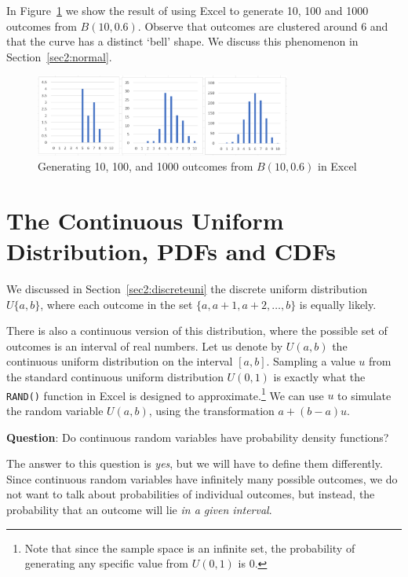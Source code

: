In Figure~\ref{fig:2_histogram_binomial} we show the result of using Excel to generate 10, 100 and 1000 outcomes from $B(10,0.6)$.
Observe that outcomes are clustered around $6$ and that the curve has a distinct `bell' shape.
We discuss this phenomenon in Section~\ref{sec2:normal}.


\begin{figure}[htbp]
	\centering
	\includegraphics[width=0.75\textwidth]{fig/2_histogram_binomial.png}
	\caption{Generating 10, 100, and 1000 outcomes from $B(10,0.6)$ in Excel \label{fig:2_histogram_binomial}}
\end{figure}




\section{The Continuous Uniform Distribution, PDFs and CDFs}

We discussed in Section~\ref{sec2:discreteuni} the discrete uniform distribution $U\{a,b\}$, where each outcome in the set $\{a,a+1,a+2,\ldots,b\}$ is equally likely.

There is also a continuous version of this distribution, where the possible set of outcomes is an interval of real numbers.
Let us denote by $U(a,b)$ the continuous uniform distribution on the interval $[a,b]$.
Sampling a value $u$ from the standard continuous uniform distribution $U(0,1)$ is exactly what the \texttt{RAND()} function in Excel is designed to approximate.\footnote{Note that since the sample space is an infinite set, the probability of generating any specific value from $U(0,1)$ is 0.}
We can use $u$ to simulate the random variable $U(a,b)$, using the transformation $a + (b-a)u.$

\textbf{Question}: Do continuous random variables have probability density functions?

The answer to this question is \emph{yes}, but we will have to define them differently.
Since continuous random variables have infinitely many possible outcomes, we do not want to talk about probabilities of individual outcomes, but instead, the probability that an outcome will lie \emph{in a given interval}.

